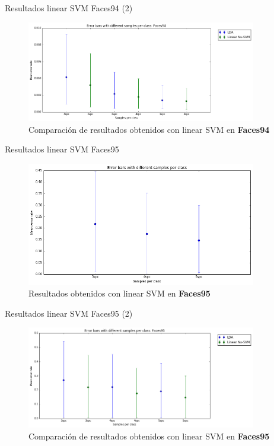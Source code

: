 \documentclass{beamer}
\begin{document}
\begin{frame}{Resultados linear SVM Faces94 (2)}
\begin{figure}[htpb!]
\centering
\includegraphics[width=10cm]{lsvm_rescomp94}
\caption{Comparación de resultados obtenidos con linear SVM en \textbf{Faces94}}
\end{figure}
\end{frame}

\begin{frame}{Resultados linear SVM Faces95}
\begin{figure}[htpb!]
\centering
\includegraphics[width=10cm]{lsvm_res95}
\caption{Resultados obtenidos con linear SVM en \textbf{Faces95}}
\end{figure}
\end{frame}

\begin{frame}{Resultados linear SVM Faces95 (2)}
\begin{figure}[htpb!]
\centering
\includegraphics[width=10cm]{lsvm_rescomp95}
\caption{Comparación de resultados obtenidos con linear SVM en \textbf{Faces95}}
\end{figure}
\end{frame}
\end{document}
